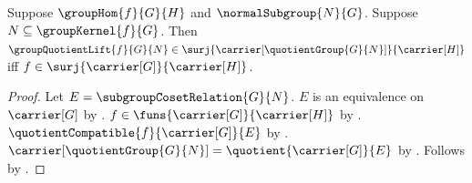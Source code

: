 \begin{theorem}\label{group_quotient_lift_surjective_iff}
    Suppose $\groupHom{f}{G}{H}$ and $\normalSubgroup{N}{G}$.
    Suppose $N\subseteq\groupKernel{f}{G}$.
    Then
        $\groupQuotientLift{f}{G}{N}\in
            \surj{\carrier[\quotientGroup{G}{N}]}{\carrier[H]}$
        iff $f\in\surj{\carrier[G]}{\carrier[H]}$.
\end{theorem}
\begin{proof}
    Let $E=\subgroupCosetRelation{G}{N}$.
    $E$ is an equivalence on $\carrier[G]$ by
        .
    $f\in\funs{\carrier[G]}{\carrier[H]}$ by
        .
    $\quotientCompatible{f}{\carrier[G]}{E}$ by
        .
    $\carrier[\quotientGroup{G}{N}]=
        \quotient{\carrier[G]}{E}$ by
        .
    Follows by
        .
\end{proof}
